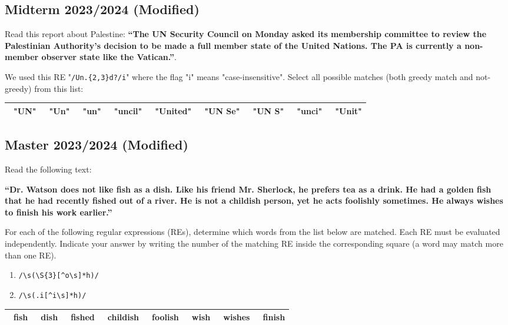 \documentclass{../extra/aakpract/aakpract}
\begin{document}
	
	\subsection{Midterm 2023/2024 (Modified)}
	
	Read this report about Palestine: \textbf{``The UN Security Council on Monday asked its membership committee to review the Palestinian Authority's decision to be made a full member state of the United Nations. The PA is currently a non-member observer state like the Vatican.''}.
	
	We used this RE "\verb|/Un.{2,3}d?/i|" where the flag "i" means "case-insensitive".  Select all possible matches (both greedy match and not-greedy) from this list:
	
	\begin{center}
		\begin{tabular}{|lllllllll|}
			\hline
			\Square\ "UN" & 
			\Square\ "Un" & 
			\Square\ "un" & 
			\Square\ "uncil" &
			\Square\ "United" &
			\Square\ "UN Se" &
			\Square\ "UN S" &
			\Square\ "unci" &
			\Square\ "Unit" \\
			\hline
		\end{tabular}
	\end{center}
	
	
	\subsection{Master 2023/2024 (Modified)}
	
	Read the following text:
	
	\textbf{``Dr. Watson does not like fish as a dish. Like his friend Mr. Sherlock, he prefers tea as a drink. He had a golden fish that he had recently fished out of a river. He is not a childish person, yet he acts foolishly sometimes. He always wishes to finish his work earlier.''}
	
	For each of the following regular expressions (REs), determine which words from the list below are matched.  
	Each RE must be evaluated independently.  
	Indicate your answer by writing the number of the matching RE inside the corresponding square (a word may match more than one RE).
	
	\begin{enumerate}
		\item \verb|/\s(\S{3}[^o\s]*h)/|
		\item \verb|/\s(.i[^i\s]*h)/|
	\end{enumerate}
	
	\begin{center}
		\begin{tabular}{|llllllll|}
			\hline
			\Square\ fish & 
			\Square\ dish & 
			\Square\ fished & 
			\Square\ childish &
			\Square\ foolish &
			\Square\ wish &
			\Square\ wishes &
			\Square\ finish \\
			\hline
		\end{tabular}
	\end{center}
	
\end{document}
